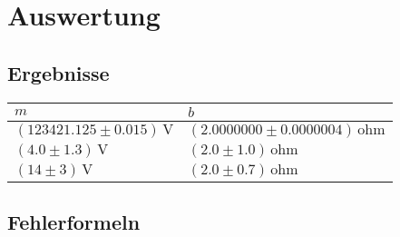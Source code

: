 \documentclass[a4paper,10pt]{scrbook}
\begin{document}
\section*{Auswertung}

\subsection*{Ergebnisse}

\begin{table}[htb]
\centering
\begin{tabular}{|l|l|}
\hline
$m$ & $b$  \\ \hline
$(123421.125\pm 0.015)\,\mathrm{V}$ & $(2.0000000\pm 0.0000004)\,\mathrm{ohm}$\\ \hline
$(4.0\pm 1.3)\,\mathrm{V}$ & $(2.0\pm 1.0)\,\mathrm{ohm}$\\ \hline
$(14\pm 3)\,\mathrm{V}$ & $(2.0\pm 0.7)\,\mathrm{ohm}$\\ \hline
\end{tabular}
\end{table}


\subsection*{Fehlerformeln}
\end{document}
